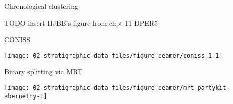 \documentclass[10pt,ignorenonframetext,compress, aspectratio=169]{beamer}
\begin{document}
\begin{frame}{Chronological clustering}

TODO insert HJBB's figure from chpt 11 DPER5

\end{frame}

\begin{frame}{CONISS}

\begin{center}\texttt{[image: 02-stratigraphic-data\_files/figure-beamer/coniss-1-1]} \end{center}

\end{frame}

\begin{frame}{Binary splitting via MRT}

\begin{center}\texttt{[image: 02-stratigraphic-data\_files/figure-beamer/mrt-partykit-abernethy-1]} \end{center}

\end{frame}
\end{document}
